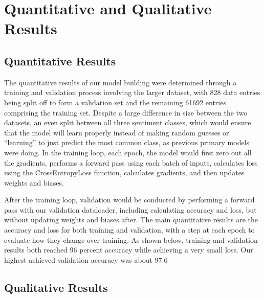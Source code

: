 \section{Quantitative and Qualitative Results}


\subsection{Quantitative Results}
\vspace{-1em}
The quantitative results of our model building were determined through a training and validation process involving the larger dataset, with 828 data entries being split off to form a validation set and the remaining 61692 entries comprising the training set. Despite a large difference in size between the two datasets, an even split between all three sentiment classes, which would ensure that the model will learn properly instead of making random guesses or “learning” to just predict the most common class, as previous primary models were doing. In the training loop, each epoch, the model would first zero out all the gradients, performs a forward pass using each batch of inputs, calculates loss using the CrossEntropyLoss function, calculates gradients, and then updates weights and biases. 
 
After the training loop, validation would be conducted by performing a forward pass with our validation dataloader, including calculating accuracy and loss, but without updating weights and biases after. The main quantitative results are the accuracy and loss for both training and validation, with a step at each epoch to evaluate how they change over training. As shown below, training and validation results both reached 96 percent accuracy while achieving a very small loss. Our highest achieved validation accuracy was about 97.6%
\vspace{-0.5em}
\subsection{Qualitative Results}
\vspace{-1em}

